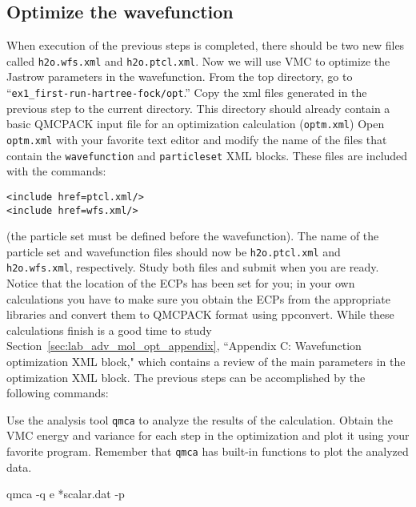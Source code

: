 \subsection{Optimize the wavefunction}
When execution of the previous steps is completed, there should be two new
files called \texttt{h2o.wfs.xml} and \texttt{h2o.ptcl.xml}. Now we will use VMC to optimize the 
Jastrow parameters in the wavefunction.  From the top directory, go to
``\texttt{ex1\_first-run-hartree-fock/opt}.'' Copy the xml files generated in the previous step
to the current directory. This directory should already contain a basic QMCPACK input
file for an optimization calculation (\texttt{optm.xml}) %
Open \texttt{optm.xml} with your favorite text editor and modify the name of the files that contain the
\texttt{wavefunction} and \texttt{particleset} XML blocks. These files are included with the commands:
\begin{lstlisting}[style=QMCPXML]
<include href=ptcl.xml/>
<include href=wfs.xml/>
\end{lstlisting}
(the particle set must be
defined before the wavefunction). The name of the particle set and wavefunction files should now be \texttt{h2o.ptcl.xml}
and \texttt{h2o.wfs.xml}, respectively. Study both files and submit when you are ready. Notice that the
location of the ECPs has been set for you; in your own calculations you have to make
sure you obtain the ECPs from the appropriate libraries and convert them to QMCPACK
format using ppconvert. While these calculations finish is a good time to study Section~\ref{sec:lab_adv_mol_opt_appendix}, ``Appendix C: Wavefunction optimization XML block," which contains a review
of the main parameters in the optimization XML block.  The
previous steps can be accomplished by the following commands:

Use the analysis tool \texttt{qmca} to analyze the results of the calculation. Obtain the VMC
energy and variance for each step in the optimization and plot it using your favorite program.
Remember that \texttt{qmca} has built-in functions to plot the analyzed data.
\begin{shade}
qmca -q e *scalar.dat -p
\end{shade}

